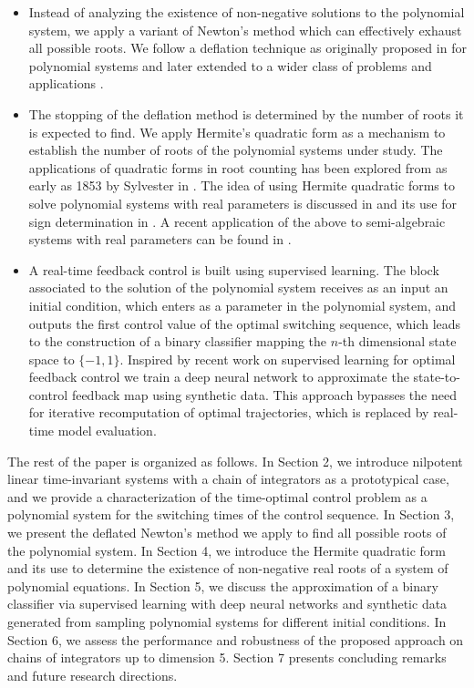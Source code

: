 \documentclass[11pt]{amsart}
\theoremstyle{definition}
\theoremstyle{remark}
\numberwithin{equation}{section}
\begin{document}
\begin{itemize}[itemsep=0.1cm,topsep=0.1cm]
 \renewcommand{\labelitemi}{\tiny{$\blacksquare$}}
\item Instead of analyzing the existence of non-negative solutions to the polynomial system, we apply a variant of Newton's method which can effectively exhaust all possible roots. We follow a deflation technique as originally proposed in \cite{brown70} for polynomial systems and later extended to a wider class of problems and applications \cite{bicego2024,deflation_2,deflation,deflation_3}. 
\item The stopping of the deflation method is determined by the number of roots it is expected to find. We apply Hermite's quadratic form as a mechanism to establish the number of roots of the polynomial systems under study. The applications of quadratic forms in root counting has been explored from as early as 1853 by Sylvester in \cite{SylvesterQuadraticForms}. The idea of using Hermite quadratic forms to solve polynomial systems with real parameters is discussed in \cite{PhuocLeSafeyElDinHermiteMatrices} and its use for sign determination in \cite{AlgorithmsBasuPollackRoy,BKR-SignDetermination,CohenSignDetermination}. 
A recent application of the above to semi-algebraic systems with real parameters can be found in \cite{GSeDRootCounting}.

\item A real-time feedback control is built using supervised learning. The block associated to the solution of the polynomial system receives as an input an initial condition, which enters as a parameter in the polynomial system, and outputs the first control value of the optimal switching sequence, which leads to the construction of a binary classifier mapping the $n$-th dimensional state space to $\{-1,1\}$. Inspired by recent work on supervised learning for optimal feedback control \cite{MPC_bookchapter,AKK,Cipriani,DKS,Lucia,NN_MPC,Oster2024} we train a deep neural network to approximate the state-to-control feedback map using synthetic data. This approach bypasses the need for iterative recomputation of optimal trajectories, which is replaced by real-time model evaluation. 
\end{itemize}
The rest of the paper is organized as follows. In Section 2, we introduce nilpotent linear time-invariant systems with a chain of integrators as a prototypical case, and we provide a characterization of the time-optimal control problem as a polynomial system for the switching times of the control sequence. In Section 3, we present the deflated Newton's method we apply to find all possible roots of the polynomial system. In Section 4, we introduce the Hermite quadratic form and its use to determine the existence of non-negative real roots of a system of polynomial equations. In Section 5, we discuss the approximation of a binary classifier via supervised learning with deep neural networks and synthetic data generated from sampling polynomial systems for different initial conditions. In Section 6, we assess the performance and robustness of the proposed approach on chains of integrators up to dimension 5. Section 7 presents concluding remarks and future research directions.
\end{document}
